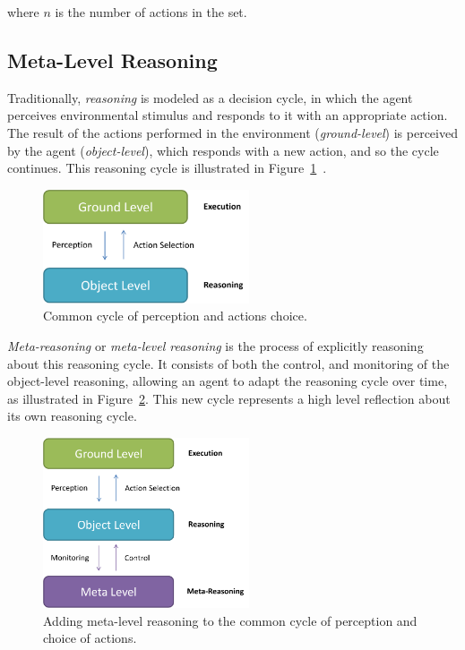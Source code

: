 where $n$ is the number of actions in the set.



\subsection{Meta-Level Reasoning}
\label{subsec:meta-reasoning}

Traditionally, \textit{reasoning} is modeled as a decision cycle, in which the agent perceives environmental stimulus and responds to it with an appropriate action. 
The result of the actions performed in the environment (\textit{ground-level})
is perceived by the agent (\textit{object-level}), which responds with a new action,
and so the cycle continues. 
This reasoning cycle is illustrated in Figure~\ref{fig:reasoning}~\cite{cox2007metareasoning}. 

\begin{figure}[ht]
\centering
\includegraphics[width=230px]{images/reasoning}
\caption{Common cycle of perception and actions choice.}
\label{fig:reasoning}
\end{figure}

\textit{Meta-reasoning} or \textit{meta-level reasoning} is the process of explicitly reasoning about this reasoning cycle. 
It consists of both the control, and monitoring of the object-level reasoning, allowing an agent to adapt the reasoning cycle over time, as illustrated in Figure~\ref{fig:metareasoning}. 
This new cycle represents a high level reflection about its own reasoning cycle. 

\begin{figure}[ht]
\centering
\includegraphics[width=230px]{images/metareasoning}
\caption{Adding meta-level reasoning to the common cycle of perception and choice of actions.}
\label{fig:metareasoning}
\end{figure}


